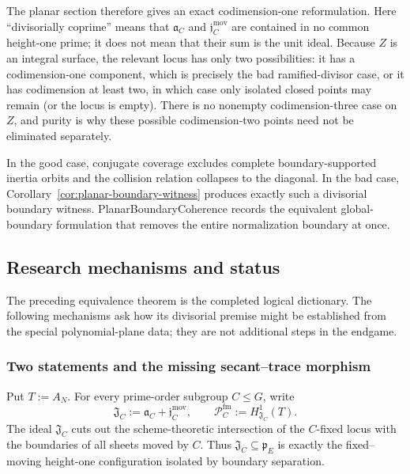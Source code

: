 \documentclass[11pt]{article}
\theoremstyle{remark}
\theoremstyle{definition}
\begin{document}
The planar section therefore gives an exact codimension-one reformulation.
Here ``divisorially coprime'' means that
\(\mathfrak a_C\) and \(\mathfrak j_C^{\mathrm{mov}}\) are contained in no
common height-one prime; it does not mean that their sum is the unit ideal.
Because \(Z\) is an integral surface, the relevant locus has only two
possibilities: it has a codimension-one component, which is precisely the
bad ramified-divisor case, or it has codimension at least two, in which case
only isolated closed points may remain (or the locus is empty).  There is no
nonempty codimension-three case on \(Z\), and purity is why these possible
codimension-two points need not be eliminated separately.

In the good case, conjugate coverage excludes complete boundary-supported
inertia orbits and the collision relation collapses to the diagonal.  In
the bad case, Corollary~\ref{cor:planar-boundary-witness} produces exactly
such a divisorial boundary witness.  PlanarBoundaryCoherence records the
equivalent global-boundary formulation that removes the entire normalization
boundary at once.

\subsection{Research mechanisms and status}

The preceding equivalence theorem is the completed logical dictionary.  The
following mechanisms ask how its divisorial premise might be established
from the special polynomial-plane data; they are not additional steps in the
endgame.

\subsubsection{Two statements and the missing secant--trace morphism}

Put \(T:=A_N\).  For every prime-order subgroup \(C\leq G\), write
\[
  \mathfrak J_C:=\mathfrak a_C+\mathfrak j_C^{\mathrm{mov}},
  \qquad
  \mathcal P_C^{\mathrm{fm}}:=H^1_{\mathfrak J_C}(T).
\]
The ideal \(\mathfrak J_C\) cuts out the scheme-theoretic intersection of
the \(C\)-fixed locus with the boundaries of all sheets moved by \(C\).
Thus \(\mathfrak J_C\subseteq\mathfrak p_E\) is exactly the fixed--moving
height-one configuration isolated by boundary separation.
\end{document}
